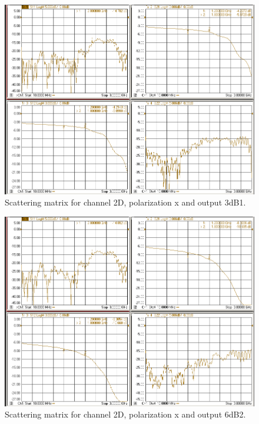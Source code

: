 \documentclass[12pt,a4paper,oneside]{article}
\begin{document}
\begin{figure}[H]
\centering
\includegraphics[width=0.9\linewidth]{VNA_results/2Dx_3dB1.png}
\caption{Scattering matrix for channel 2D, polarization x and output 3dB1.}
\label{fig:2Dx_3dB1}
\end{figure}


\begin{figure}[H]
\centering
\includegraphics[width=0.9\linewidth]{VNA_results/2Dx_6dB2.png}
\caption{Scattering matrix for channel 2D, polarization x and output 6dB2.}
\label{fig:2Dx_6dB2}
\end{figure}
\end{document}
